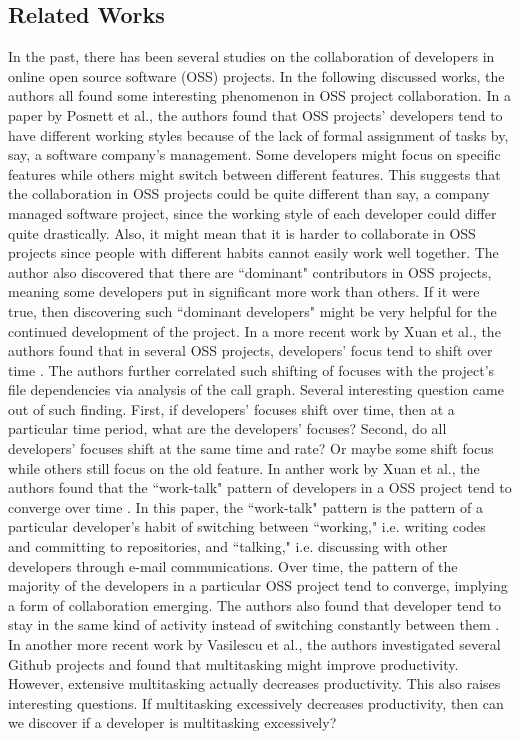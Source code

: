 \documentclass{article}
\begin{document}
\subsection{Related Works}
In the past, there has been several studies on the collaboration of developers in online open source software (OSS) projects. In the following discussed works, the authors all found some interesting phenomenon in OSS project collaboration. In a paper by Posnett et al.\citep{posnett2013dual}, the authors found that OSS projects' developers tend to have different working styles because of the lack of formal assignment of tasks by, say, a software company's management. Some developers might focus on specific features while others might switch between different features. This suggests that the collaboration in OSS projects could be quite different than say, a company managed software project, since the working style of each developer could differ quite drastically. Also, it might mean that it is harder to collaborate in OSS projects since people with different habits cannot easily work well together. The author also discovered that there are ``dominant" contributors in OSS projects, meaning some developers put in significant more work than others. If it were true, then discovering such ``dominant developers" might be very helpful for the continued development of the project. In a more recent work by Xuan et al.\citep{xuan2014focus}, the authors found that in several OSS projects, developers' focus tend to shift over time . The authors further correlated such shifting of focuses with the project's file dependencies via analysis of the call graph. Several interesting question came out of such finding. First, if developers' focuses shift over time, then at a particular time period, what are the developers' focuses? Second, do all developers' focuses shift at the same time and rate? Or maybe some shift focus while others still focus on the old feature. In anther work by Xuan et al.\citep{xuan2016converging}, the authors found that the ``work-talk" pattern of developers in a OSS project tend to converge over time . In this paper, the ``work-talk" pattern is the pattern of a particular developer's habit of switching between ``working," i.e. writing codes and committing to repositories, and ``talking," i.e. discussing with other developers through e-mail communications. Over time, the pattern of the majority of the developers in a particular OSS project tend to converge, implying a form of collaboration emerging. The authors also found that developer tend to stay in the same kind of activity instead of switching constantly between them \citep{xuan2016converging}. In another more recent work by Vasilescu et al.\citep{vasilescu2016sky}, the authors investigated several Github projects and found that multitasking might improve productivity. However, extensive multitasking actually decreases productivity. This also raises interesting questions. If multitasking excessively decreases productivity, then can we discover if a developer is multitasking excessively?\\
\end{document}
